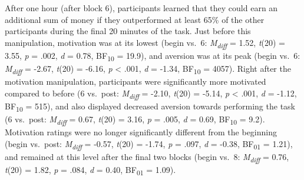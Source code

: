 \documentclass[11pt,]{memoir}
\begin{document}
After one hour (after block 6), participants learned that they could earn an additional sum of money if they outperformed at least 65\% of the other participants during the final 20 minutes of the task. Just before this manipulation, motivation was at its lowest (begin vs.~6: \emph{M\textsubscript{diff}} = 1.52, \emph{t}(20) = 3.55, \emph{p} = .002, \emph{d} = 0.78, BF\textsubscript{10} = 19.9), and aversion was at its peak (begin vs.~6: \emph{M\textsubscript{diff}} = -2.67, \emph{t}(20) = -6.16, \emph{p} \textless{} .001, \emph{d} = -1.34, BF\textsubscript{10} = 4057). Right after the motivation manipulation, participants were significantly more motivated compared to before (6 vs.~post: \emph{M\textsubscript{diff}} = -2.10, \emph{t}(20) = -5.14, \emph{p} \textless{} .001, \emph{d} = -1.12, BF\textsubscript{10} = 515), and also displayed decreased aversion towards performing the task (6 vs.~post: \emph{M\textsubscript{diff}} = 0.67, \emph{t}(20) = 3.16, \emph{p} = .005, \emph{d} = 0.69, BF\textsubscript{10} = 9.2). Motivation ratings were no longer significantly different from the beginning (begin vs.~post: \emph{M\textsubscript{diff}} = -0.57, \emph{t}(20) = -1.74, \emph{p} = .097, \emph{d} = -0.38, BF\textsubscript{01} = 1.21), and remained at this level after the final two blocks (begin vs.~8: \emph{M\textsubscript{diff}} = 0.76, \emph{t}(20) = 1.82, \emph{p} = .084, \emph{d} = 0.40, BF\textsubscript{01} = 1.09).
\end{document}
